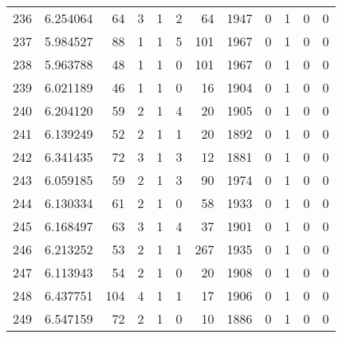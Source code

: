 \begin{tabular}{lrrrrrrrrrrr}
236 &  6.254064 &   64 &      3 &        1 &      2 &              64 &  1947 &               0 &               1 &               0 &               0 \\
237 &  5.984527 &   88 &      1 &        1 &      5 &             101 &  1967 &               0 &               1 &               0 &               0 \\
238 &  5.963788 &   48 &      1 &        1 &      0 &             101 &  1967 &               0 &               1 &               0 &               0 \\
239 &  6.021189 &   46 &      1 &        1 &      0 &              16 &  1904 &               0 &               1 &               0 &               0 \\
240 &  6.204120 &   59 &      2 &        1 &      4 &              20 &  1905 &               0 &               1 &               0 &               0 \\
241 &  6.139249 &   52 &      2 &        1 &      1 &              20 &  1892 &               0 &               1 &               0 &               0 \\
242 &  6.341435 &   72 &      3 &        1 &      3 &              12 &  1881 &               0 &               1 &               0 &               0 \\
243 &  6.059185 &   59 &      2 &        1 &      3 &              90 &  1974 &               0 &               1 &               0 &               0 \\
244 &  6.130334 &   61 &      2 &        1 &      0 &              58 &  1933 &               0 &               1 &               0 &               0 \\
245 &  6.168497 &   63 &      3 &        1 &      4 &              37 &  1901 &               0 &               1 &               0 &               0 \\
246 &  6.213252 &   53 &      2 &        1 &      1 &             267 &  1935 &               0 &               1 &               0 &               0 \\
247 &  6.113943 &   54 &      2 &        1 &      0 &              20 &  1908 &               0 &               1 &               0 &               0 \\
248 &  6.437751 &  104 &      4 &        1 &      1 &              17 &  1906 &               0 &               1 &               0 &               0 \\
249 &  6.547159 &   72 &      2 &        1 &      0 &              10 &  1886 &               0 &               1 &               0 &               0 \\

\end{tabular}
